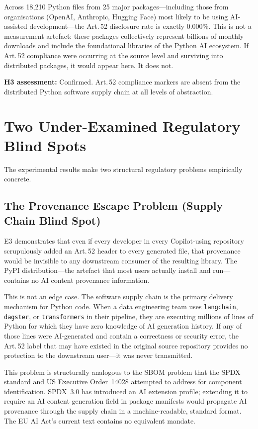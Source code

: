 \documentclass[conference]{IEEEtran}
\begin{document}
Across 18,210 Python files from 25 major packages---including those from
organisations (OpenAI, Anthropic, Hugging Face) most likely to be using
AI-assisted development---the Art.\,52 disclosure rate is exactly
0.000\%.  This is not a measurement artefact: these packages collectively
represent billions of monthly downloads and include the foundational
libraries of the Python AI ecosystem.  If Art.\,52 compliance were
occurring at the source level and surviving into distributed packages,
it would appear here.  It does not.

\textbf{H3 assessment:} Confirmed.  Art.\,52 compliance markers are
absent from the distributed Python software supply chain at all levels
of abstraction.

\section{Two Under-Examined Regulatory Blind Spots}
\label{sec:blindspots}

The experimental results make two structural regulatory problems
empirically concrete.

\subsection{The Provenance Escape Problem (Supply Chain Blind Spot)}

E3 demonstrates that even if every developer in every Copilot-using
repository scrupulously added an Art.\,52 header to every generated
file, that provenance would be invisible to any downstream consumer of
the resulting library.  The PyPI distribution---the artefact that most
users actually install and run---contains no AI content provenance
information.

This is not an edge case.  The software supply chain is the primary
delivery mechanism for Python code.  When a data engineering team uses
\texttt{langchain}, \texttt{dagster}, or \texttt{transformers} in their
pipeline, they are executing millions of lines of Python for which they
have zero knowledge of AI generation history.  If any of those lines
were AI-generated and contain a correctness or security error, the
Art.\,52 label that may have existed in the original source repository
provides no protection to the downstream user---it was never transmitted.

This problem is structurally analogous to the SBOM problem that the SPDX
standard and US Executive Order~14028 attempted to address for component
identification.  SPDX~3.0 has introduced an AI extension profile;
extending it to require an AI content generation field in package
manifests would propagate AI provenance through the supply chain in a
machine-readable, standard format.  The EU AI Act's current text
contains no equivalent mandate.
\end{document}
